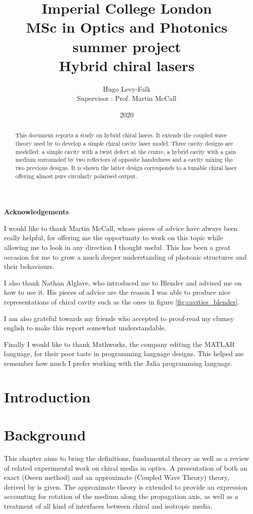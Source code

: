 \documentclass{report}
\title{Imperial College London\\MSc in Optics and Photonics summer project\\Hybrid chiral lasers}
\author{Hugo Levy-Falk\\Supervisor : Prof. Martin McCall}
\date{2020}
\newenvironment{acknowledgements}%
{\cleardoublepage\thispagestyle{empty}\null\vfill\begin{center}%
		\bfseries Acknowledgements\end{center}}%
{\vfill\null}
\begin{document}
	
\maketitle

\begin{abstract}
	
	This document reports a study on hybrid chiral lasers. It extends the coupled wave theory used by  to develop a simple chiral cavity laser model. Three cavity designs are modelled: a simple cavity with a twist defect at the centre, a hybrid cavity with a gain medium surrounded by two reflectors of opposite handedness and a cavity mixing the two previous designs. It is shown the latter design corresponds to a tunable chiral laser offering almost pure circularly polarised output.

\end{abstract}

\begin{acknowledgements}
	I would like to thank Martin McCall, whose pieces of advice have always been really helpful, for offering me the opportunity to work on this topic while allowing me to look in any direction I thought useful. This has been a great occasion for me to grow a much deeper understanding of photonic structures and their behaviours.
	
	I also thank Nathan Alglave, who introduced me to Blender and advised me on how to use it. His pieces of advice are the reason I was able to produce nice representations of chiral cavity such as the ones in figure \ref{fig:cavities_blender}.
	
	I am also grateful towards my friends who accepted to proof-read my clumsy english to make this report somewhat understandable.
	
	Finally I would like to thank Mathworks, the company editing the MATLAB language, for their poor taste in programming language designs. This helped me remember how much I prefer working with the Julia programming language.
\end{acknowledgements}

\tableofcontents
\listoffigures

\chapter{Introduction}

\chapter{Background}
This chapter aims to bring the definitions, fundamental theory as well as a review of related experimental work on chiral media in optics. A presentation of both an exact (Oseen method) and an approximate (Coupled Wave Theory) theory, derived by \textcite{mccall_simplified_2009} is given. The approximate theory is extended to provide an expression accounting for rotation of the medium along the propagation axis, as well as a treatment of all kind of interfaces between chiral and isotropic media. 






\end{document}
